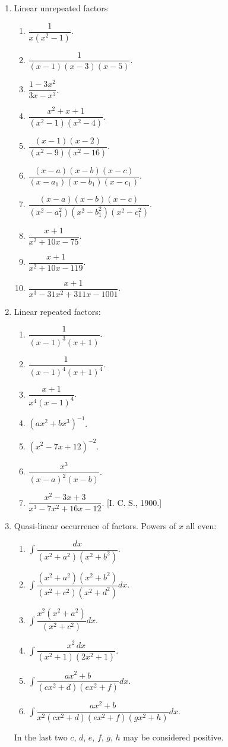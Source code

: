 \documentclass[11pt, a4paper]{article}
\newcommand{\source}[1]{\hfill\textnormal{[#1]}}
\begin{document}
\begin{enumerate}[leftmargin=2em]

\item Linear unrepeated factors
\begin{enumerate}[label=(\roman*)]
\item $\dfrac{1}{x(x^2-1)}$.
\item $\dfrac{1}{(x-1)(x-3)(x-5)}$.
\item $\dfrac{1-3x^2}{3x-x^3}$.
\item $\dfrac{x^2+x+1}{(x^2-1)(x^2-4)}$.
\item $\dfrac{(x-1)(x-2)}{(x^2-9)(x^2-16)}$.
\item $\dfrac{(x-a)(x-b)(x-c)}{(x-a_1)(x-b_1)(x-c_1)}$.
\item $\dfrac{(x-a)(x-b)(x-c)}{(x^2-a_1^2)(x^2-b_1^2)(x^2-c_1^2)}$.
\item $\dfrac{x+1}{x^2+10x-75}$.
\item $\dfrac{x+1}{x^2+10x-119}$.
\item $\dfrac{x+1}{x^3-31x^2+311x-1001}$.
\end{enumerate}

\item Linear repeated factors:
\begin{enumerate}[label=(\roman*)]
\item $\dfrac{1}{(x-1)^3(x+1)}$.
\item $\dfrac{1}{(x-1)^4(x+1)^4}$.
\item $\dfrac{x+1}{x^4(x-1)^4}$.
\item $(ax^2+bx^3)^{-1}$.
\item $(x^2-7x+12)^{-2}$.
\item $\dfrac{x^3}{(x-a)^2(x-b)}$.
\item $\dfrac{x^2-3x+3}{x^3-7x^2+16x-12}$. \source{I. C. S., 1900.}
\end{enumerate}

\item Quasi-linear occurrence of factors. Powers of $x$ all even:
\begin{enumerate}[label=(\roman*)]
\item $\displaystyle\int \dfrac{dx}{(x^2+a^2)(x^2+b^2)}$.
\item $\displaystyle\int \dfrac{(x^2+a^2)(x^2+b^2)}{(x^2+c^2)(x^2+d^2)}dx$.
\item $\displaystyle\int \dfrac{x^2(x^2+a^2)}{(x^2+c^2)}dx$.
\item $\displaystyle\int \dfrac{x^2\,dx}{(x^2+1)(2x^2+1)}$.
\item $\displaystyle\int \dfrac{ax^2+b}{(cx^2+d)(ex^2+f)}dx$.
\item $\displaystyle\int \dfrac{ax^2+b}{x^2(cx^2+d)(ex^2+f)(gx^2+h)}dx$.
\end{enumerate}
In the last two $c$, $d$, $e$, $f$, $g$, $h$ may be considered positive.


\end{enumerate}
\end{document}
